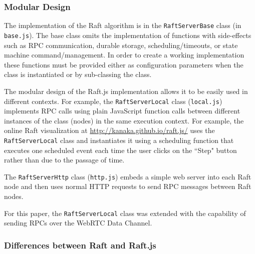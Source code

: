 \documentclass[conference,compsoc]{./IEEEtran/IEEEtran}
\begin{document}
\subsubsection{Modular Design}

The implementation of the Raft algorithm is in the
\texttt{RaftServerBase} class (in \texttt{base.js}). The base class
omits the implementation of functions with side-effects such as RPC
communication, durable storage, scheduling/timeouts, or state machine
command/management. In order to create a working implementation these
functions must be provided either as configuration parameters when the
class is instantiated or by sub-classing the class.

The modular design of the Raft.js implementation allows it to be
easily used in different contexts. For example, the \texttt{RaftServerLocal}
class (\texttt{local.js}) implements RPC calls using plain JavaScript function
calls between different instances of the class (nodes) in the same
execution context. For example, the online Raft visualization at
\href{http://kanaka.github.io/raft.js/}{http://kanaka.github.io/raft.js/}
\cite{raft.js:visualization} uses the \texttt{RaftServerLocal} class
and instantiates it using a scheduling function that executes one
scheduled event each time the user clicks on the ``Step" button rather
than due to the passage of time.

The \texttt{RaftServerHttp} class (\texttt{http.js}) embeds a simple
web server into each Raft node and then uses normal HTTP requests to
send RPC messages between Raft nodes.

For this paper, the \texttt{RaftServerLocal} class was extended with
the capability of sending RPCs over the WebRTC Data Channel.

\subsubsection{Differences between Raft and Raft.js}
\end{document}
